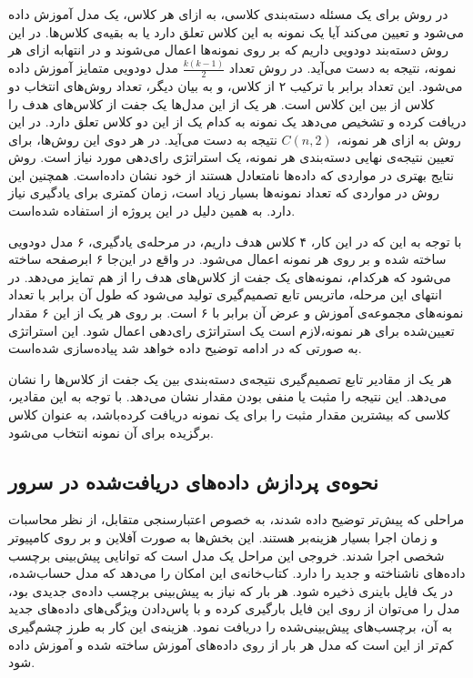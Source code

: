در روش  برای یک مسئله دسته‌بندی  کلاسی،‌ به ازای هر کلاس، یک مدل  آموزش داده می‌شود و تعیین می‌کند آیا یک نمونه به این کلاس تعلق دارد یا به بقیه‌ی کلاس‌ها. در این روش  دسته‌بند دودویی داریم که بر روی نمونه‌ها اعمال می‌شوند و در انتهابه ازای هر نمونه،  نتیجه به دست می‌آید. 
در روش  تعداد $\frac{k(k-1)}{2}$ مدل  دودویی متمایز آموزش داده می‌شود. این تعداد برابر با ترکیب ۲ از  کلاس،‌ و به بیان دیگر، تعداد روش‌های انتخاب دو کلاس از بین این  کلاس است. هر یک از این مدل‌ها یک جفت از کلاس‌های هدف را دریافت کرده و تشخیص می‌دهد یک نمونه به کدام یک از این دو کلاس تعلق دارد. در این روش به ازای هر نمونه، $C(n, 2)$ نتیجه به دست می‌آید.
در هر دوی این روش‌ها، برای تعیین نتیجه‌ی نهایی دسته‌بندی هر نمونه، یک استراتژی رای‌دهی مورد نیاز است. روش  نتایج بهتری در مواردی که داده‌ها نامتعادل هستند از خود نشان داده‌است. همچنین این روش در مواردی که تعداد نمونه‌ها بسیار زیاد است،‌ زمان کمتری برای یادگیری نیاز دارد.\cite{Mondejar} به همین دلیل در این پروژه از  استفاده شده‌است.

با توجه به این که در این کار‌،‌ ۴ کلاس هدف داریم، در مرحله‌ی یادگیری‌، ۶ مدل دودویی ساخته شده و بر روی هر نمونه اعمال می‌شود. در واقع در این‌جا ۶ ابرصفحه ساخته می‌شود که هرکدام، نمونه‌های  یک جفت از کلاس‌های هدف را از هم تمایز می‌دهد. در انتهای این مرحله،‌ ماتریس تابع تصمیم‌گیری تولید می‌شود که طول آن برابر با تعداد نمونه‌های مجموعه‌ی آموزش و عرض آن برابر با ۶ است. بر روی هر یک از این ۶ مقدار تعیین‌شده برای هر نمونه،‌لازم است یک استراتژی رای‌دهی اعمال شود. این استراتژی به صورتی که در ادامه توضیح داده خواهد شد پیاده‌سازی شده‌است.

هر یک از مقادیر تابع تصمیم‌گیری نتیجه‌ی دسته‌بندی بین یک جفت از کلاس‌ها را نشان می‌دهد. این نتیجه را مثبت یا منفی بودن مقدار نشان می‌دهد. با توجه به این مقادیر، کلاسی که بیشترین مقدار مثبت را برای یک نمونه دریافت کرده‌باشد، به عنوان کلاس برگزیده برای آن نمونه انتخاب می‌شود. 

	\subsection{نحوه‌ی پردازش داده‌های دریافت‌شده در سرور}

مراحلی که پیش‌تر توضیح داده شدند، به خصوص اعتبارسنجی متقابل، از نظر محاسبات و زمان اجرا بسیار هزینه‌بر هستند. این بخش‌ها به صورت آفلاین و بر روی کامپیوتر شخصی اجرا شدند. خروجی این مراحل یک مدل  است که توانایی پیش‌بینی برچسب داده‌‌های ناشناخته و جدید را دارد. کتاب‌خانه‌ی  این امکان را می‌دهد که مدل  حساب‌شده، در یک فایل باینری ذخیره شود. هر بار که نیاز به پیش‌بینی برچسب داده‌ی جدیدی بود، مدل  را می‌توان از روی این فایل بارگیری کرده و با پاس‌دادن ویژگی‌های داده‌های جدید به آن، برچسب‌های پیش‌بینی‌شده را دریافت نمود. هزینه‌ی این کار به طرز چشم‌گیری کم‌تر از این است که مدل هر بار از روی داده‌های آموزش ساخته‌ شده و آموزش داده شود.

